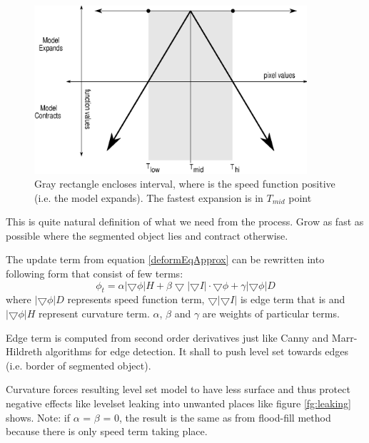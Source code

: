 \begin{figure}
    \centering
    \includegraphics[width=0.9\textwidth]{data/speedFunction}
    \caption[Graph of thresholding based speed function]
    {
      Gray rectangle encloses interval, where is the speed function positive (i.e. the model expands).
      The fastest expansion is in $T_{mid}$ point
    }
    \label{fg:speedFunction}
\end{figure}

This is quite natural definition of what we need from the process.
Grow as fast as possible where the segmented object lies and contract otherwise.

The update term from equation \ref{deformEqApprox} can be rewritten into following form that consist of few terms:
\begin{equation}
\phi_t = \alpha |\bigtriangledown \phi| H + \beta
\bigtriangledown|\bigtriangledown I|\cdot \bigtriangledown \phi +
\gamma|\bigtriangledown \phi|D
\end{equation}
where $|\bigtriangledown \phi|D$ represents speed function term, $\bigtriangledown|\bigtriangledown I|$ is edge term that is and $|\bigtriangledown \phi| H$ represent curvature term. $\alpha$, $\beta$ and $\gamma$ are weights of particular terms.

Edge term is computed from second order derivatives just like Canny and Marr-Hildreth algorithms for edge detection.
It shall to push level set towards edges (i.e. border of segmented object).

Curvature forces resulting level set model to have less surface and thus protect negative effects like levelset leaking into unwanted places like figure \ref{fg:leaking} shows.
Note: if $\alpha$ = $\beta$ = 0, the result is the same as from flood-fill method because there is only speed term taking place.

